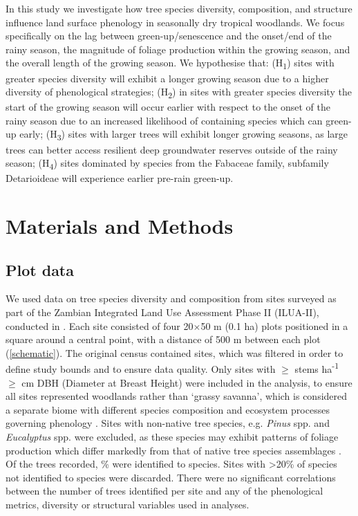 \documentclass[11pt,a4paper]{article}
\begin{document}
In this study we investigate how tree species diversity, composition, and structure influence land surface phenology in seasonally dry tropical woodlands. We focus specifically on the lag between green-up/senescence and the onset/end of the rainy season, the magnitude of foliage production within the growing season, and the overall length of the growing season. We hypothesise that: (H\textsubscript{1}) sites with greater species diversity will exhibit a longer growing season due to a higher diversity of phenological strategies; (H\textsubscript{2}) in sites with greater species diversity the start of the growing season will occur earlier with respect to the onset of the rainy season due to an increased likelihood of containing species which can green-up early; (H\textsubscript{3}) sites with larger trees will exhibit longer growing seasons, as large trees can better access resilient deep groundwater reserves outside of the rainy season; (H\textsubscript{4}) sites dominated by species from the Fabaceae family, subfamily Detarioideae will experience earlier pre-rain green-up. 


\section{Materials and Methods}

\subsection{Plot data}

We used data on tree species diversity and composition from \nSites{} sites surveyed as part of the Zambian Integrated Land Use Assessment Phase II (ILUA-II), conducted in \censusDate{} \citep{Mukosha2009, Pelletier2018}. Each site consisted of four 20$\times$50 m (0.1 ha) plots positioned in a square around a central point, with a distance of 500 m between each plot (\autoref{schematic}). The original census contained \nTotalSites{} sites, which was filtered in order to define study bounds and to ensure data quality. Only sites with $\geq$\treesHa{} stems ha\textsuperscript{-1} $\geq$\stemSize{} cm DBH (Diameter at Breast Height) were included in the analysis, to ensure all sites represented woodlands rather than `grassy savanna', which is considered a separate biome with different species composition and ecosystem processes governing phenology \citep{Parr2014}. Sites with non-native tree species, e.g. \textit{Pinus} spp. and \textit{Eucalyptus} spp. were excluded, as these species may exhibit patterns of foliage production which differ markedly from that of native tree species assemblages \citep{Broadhead2003}. Of the \nTrees{} trees recorded, \perSpID{}\% were identified to species. Sites with >20\% of species not identified to species were discarded. There were no significant correlations between the number of trees identified per site and any of the phenological metrics, diversity or structural variables used in analyses.
\end{document}
